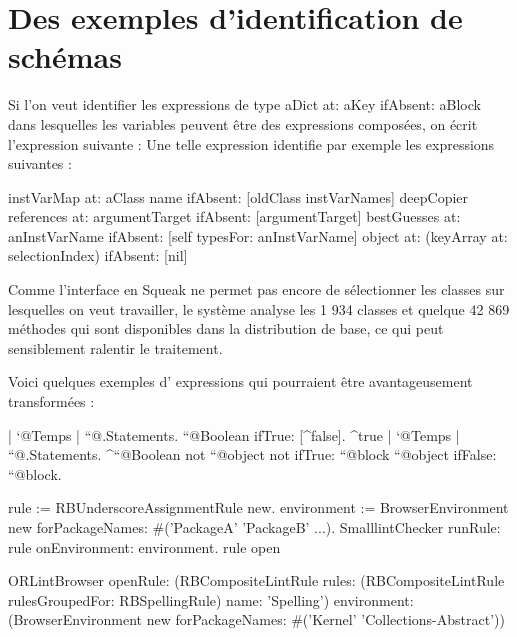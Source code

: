 \documentclass[a4paper,10pt,twoside]{book}
\begin{document}
\section{Des exemples d'identification de sch\'emas}

Si l'on veut identifier les expressions de type
aDict at: aKey ifAbsent: aBlock dans lesquelles les variables peuvent être des expressions compos\'ees, on \'ecrit l'expression
suivante :
Une telle expression identifie par exemple les expressions suivantes :

\begin{code}{}
instVarMap at: aClass name ifAbsent: [oldClass instVarNames]
deepCopier references at: argumentTarget ifAbsent: [argumentTarget]
bestGuesses at: anInstVarName ifAbsent: [self typesFor: anInstVarName]
object at: (keyArray at: selectionIndex) ifAbsent: [nil]
\end{code}

Comme l'interface en Squeak ne permet pas encore de s\'electionner les
classes sur lesquelles on veut travailler, le syst\`eme analyse les 1
934 classes et quelque 42 869 m\'ethodes qui sont disponibles dans la
distribution de base, ce qui peut sensiblement ralentir le traitement.

Voici quelques exemples d'
expressions qui pourraient être avantageusement transform\'ees :

\begin{code}{}
| `@Temps | ``@.Statements. ``@Boolean ifTrue: [^false]. ^true
| `@Temps | ``@.Statements. ^``@Boolean not
``@object not ifTrue: ``@block
``@object ifFalse: ``@block.
\end{code}



\begin{code}{}
rule := RBUnderscoreAssignmentRule new.
environment := BrowserEnvironment new forPackageNames: \#('PackageA'
'PackageB' ...).
SmalllintChecker runRule: rule onEnvironment: environment.
rule open
\end{code}

\begin{code}{}
ORLintBrowser
	openRule: (RBCompositeLintRule rules: (RBCompositeLintRule
rulesGroupedFor: RBSpellingRule) name: 'Spelling')
	environment: (BrowserEnvironment new forPackageNames: \#('Kernel'
'Collections-Abstract'))
\end{code}
\end{document}
